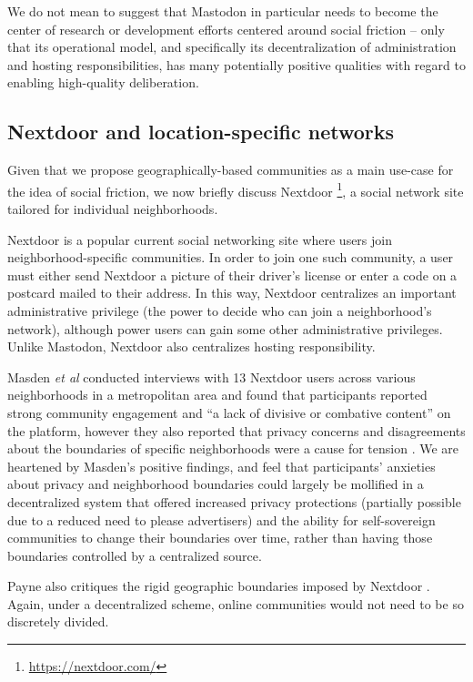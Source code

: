 \documentclass[sigconf,authordraft]{acmart}
\begin{document}
We do not mean to suggest that Mastodon in particular needs to become the center of research or development efforts centered around social friction -- only that its operational model, and specifically its decentralization of administration and hosting responsibilities, has many potentially positive qualities with regard to enabling high-quality deliberation.

\subsection{Nextdoor and location-specific networks}

Given that we propose geographically-based communities as a main use-case for the idea of social friction, we now briefly discuss Nextdoor \footnote{\url{https://nextdoor.com/}}, a social network site tailored for individual neighborhoods.

Nextdoor is a popular current social networking site where users join neighborhood-specific communities. In order to join one such community, a user must either send Nextdoor a picture of their driver's license or enter a code on a postcard mailed to their address. In this way, Nextdoor centralizes an important administrative privilege (the power to decide who can join a neighborhood's network), although power users can gain some other administrative privileges. Unlike Mastodon, Nextdoor also centralizes hosting responsibility.

Masden {\itshape et al} conducted interviews with 13 Nextdoor users across various neighborhoods in a metropolitan area and found that participants reported strong community engagement and ``a lack of divisive or combative content'' on the platform, however they also reported that privacy concerns and disagreements about the boundaries of specific neighborhoods were a cause for tension \cite{masden2014tensions}. We are heartened by Masden's positive findings, and feel that participants' anxieties about privacy and neighborhood boundaries could largely be mollified in a decentralized system that offered increased privacy protections (partially possible due to a reduced need to please advertisers) and the ability for self-sovereign communities to change their boundaries over time, rather than having those boundaries controlled by a centralized source.

Payne also critiques the rigid geographic boundaries imposed by Nextdoor \cite{payne2017welcome}. Again, under a decentralized scheme, online communities would not need to be so discretely divided.
\end{document}

